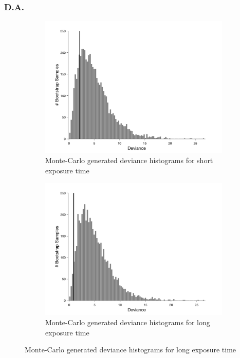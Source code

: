 \documentclass{article}
\begin{document}
\subsubsection*{D.A.}
\begin{figure}[!hb]
    \begin{subfigure}{0.494\textwidth}
        \centering
        \includegraphics[width = \linewidth]{Thesis/plots/gof/cutNo/cutNo_da_short_bootstrap.png}
        \caption{Monte-Carlo generated deviance histograms for short exposure time}
        \label{fig:da_gof_short_bootstrap}
    \end{subfigure}
    \hspace{0.01\textwidth}
    \begin{subfigure}{0.494\textwidth}
        \centering
        \includegraphics[width = \linewidth]{Thesis/plots/gof/cutNo/cutNo_da_long_bootstrap.png}
        \caption{Monte-Carlo generated deviance histograms for long exposure time}
        \label{fig:da_gof_long_bootstrap}
    \end{subfigure}
    

\end{figure}
\end{document}
